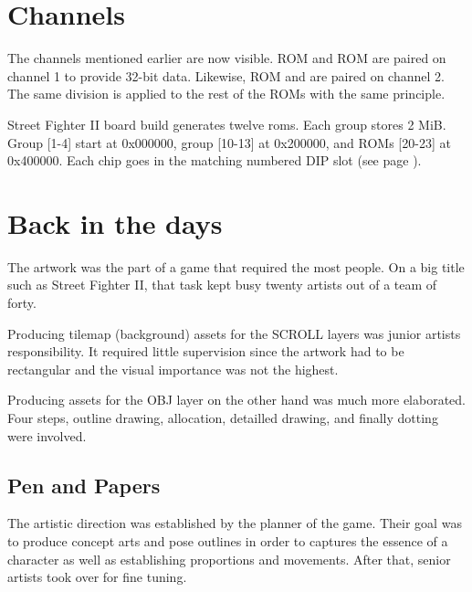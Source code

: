 
\section{Channels}\label{channels}
The channels mentioned earlier are now visible. ROM  and ROM  are paired on channel 1 to provide 32-bit data. Likewise, ROM  and  are paired on channel 2. The same division is applied to the rest of the ROMs with the same principle. 


Street Fighter II board build generates twelve roms. Each group stores 2 MiB. Group [1-4] start at 0x000000, group [10-13] at 0x200000, and ROMs [20-23] at 0x400000. Each chip goes in the matching numbered DIP slot (see page \pageref{boardb_no_chips}).










\section{Back in the days}

The artwork was the part of a game that required the most people. On a big title such as Street Fighter II, that task kept busy twenty artists out of a team of forty.

Producing tilemap (background) assets for the SCROLL layers was junior artists responsibility. It required little supervision since the artwork had to be rectangular and the visual importance was not the highest.

Producing assets for the OBJ layer on the other hand was much more elaborated. Four steps, outline drawing, allocation, detailled drawing, and finally dotting were involved.



\subsection{Pen and Papers}
The artistic direction was established by the planner of the game. Their goal was to produce concept arts and pose outlines in order to captures the essence of a character as well as establishing proportions and movements. After that, senior artists took over for fine tuning.

